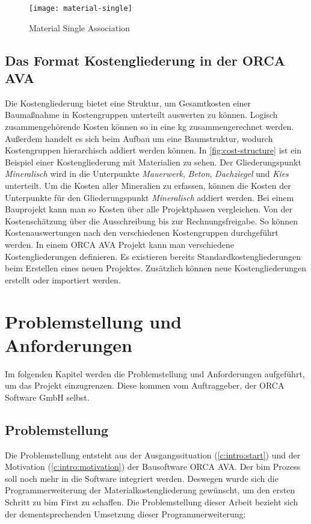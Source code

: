 \begin{figure}[h]
	\centering
	\texttt{[image: material-single]}
	\caption[IfcMaterial]{Material Single Association}
	\label{fig:material-single}
\end{figure}

\section{Das Format Kostengliederung in der ORCA AVA}
\label{c:basics:coststructure}
Die Kostengliederung bietet eine Struktur, um Gesamtkosten einer Baumaßnahme in Kostengruppen unterteilt auswerten zu können. Logisch zusammengehörende Kosten können so in eine \ac{kg} zusammengerechnet werden. Außerdem handelt es sich beim Aufbau um eine Baumstruktur, wodurch Kostengruppen hierarchisch addiert werden können. In \autoref{fig:cost-structure} ist ein Beispiel einer Kostengliederung mit Materialien zu sehen. Der Gliederungspunkt \textit{Mineralisch} wird in die Unterpunkte \textit{Mauerwerk}, \textit{Beton}, \textit{Dachziegel} und \textit{Kies} unterteilt. Um die Kosten aller Mineralien zu erfassen, können die Kosten der Unterpunkte für den Gliederungspunkt \textit{Mineralisch} addiert werden.
Bei einem Bauprojekt kann man so Kosten über alle Projektphasen vergleichen. Von der Kostenschätzung über die Ausschreibung bis zur Rechnungsfreigabe. So können Kostenauswertungen nach den verschiedenen Kostengruppen durchgeführt werden. In einem ORCA AVA Projekt kann man verschiedene Kostengliederungen definieren. Es existieren bereits Standardkostengliederungen beim Erstellen eines neuen Projektes. Zusätzlich können neue Kostengliederungen erstellt oder importiert werden.\citep[vgl.][]{helpdesk-kostengliederungen}

\chapter{Problemstellung und Anforderungen}
\label{c:requirements}
Im folgenden Kapitel werden die Problemstellung und Anforderungen aufgeführt, um das Projekt einzugrenzen. Diese kommen vom Auftraggeber, der \glqq ORCA Software GmbH\grqq{} selbst.

\section{Problemstellung}
\label{c:requirements:problem}

Die Problemstellung entsteht aus der Ausgangssituation (\autoref{c:intro:start}) und der Motivation (\autoref{c:intro:motivation}) der Bausoftware ORCA AVA. Der \ac{bim} Prozess soll noch mehr in die Software integriert werden. Deswegen wurde sich die Programmerweiterung der Materialkostengliederung gewünscht, um den ersten Schritt zu \glqq \ac{bim} First\grqq{} zu schaffen. Die Problemstellung dieser Arbeit bezieht sich der dementsprechenden Umsetzung dieser Programmerweiterung:

